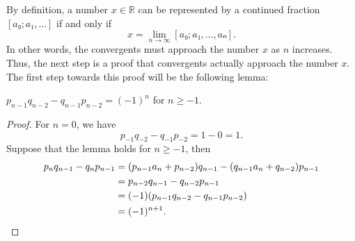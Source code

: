 \iffalse
\begin{figure}[tb]
  \centering
  
  \caption{
    The golden rectangle with side lengths $1$ and $φ$.
    Cutting of one unit square from the rectangle gives another rectangle with lengths $φ - 1$ and $1$.
    The ratio between the longer and shorter side remains the same.
  }
  \label{fig:golden-rectangle}
\end{figure}

\begin{example}
  Consider the golden ratio $φ$.
  It is the positive real root of the polynomial $p(x) = x^2 - x - 1$,
  which means that it satisfies $φ = 1 + 1/φ$.
  Since it is positive, we have $1 < φ = 1 + 1/φ < 2$ and $\floor{φ} = 1$.
  This makes the construction of the continued fraction particularly simple since
  \[
    φ = 1 + \cfrac{1}{1 + \cfrac{1}{1 + \cfrac{1}{⋱}}}.
  \]
  So the golden ratio $φ$ is represented by $[1; \overline{1}]$.
\end{example}

For the golden ratio, there is also a geometric interpretation via the golden
rectangle as shown in Figure~\ref{fig:golden-rectangle}.
The golden rectangle has side lengths of $1$ and $φ$,
and the Euclidean algorithm tries to remove as many unit squares inside the
golden rectangle as possible.
In this case, only one square is removed
and we get a new rectangle with side lengths $1$ and $φ - 1$.
But the ratios between the longer and shorter sides remain the same since
\[
  φ^2 - φ - 1 = 0 ⇔ φ(φ - 1) = 1 ⇔ \frac{φ}{1} = \frac{1}{φ - 1}.
\]
Therefore, in the next rectangle only one square of length $φ - 1$ will be
removed again.
\fi

By definition,
a number $x ∈ ℝ$ can be represented by a continued fraction $[a₀; a₁, …]$
if and only if
\[
  x = \lim_{n → ∞} [a₀; a₁, …, aₙ].
\]
In other words, the convergents must approach the number $x$ as $n$ increases.
Thus, the next step is a proof that convergents actually approach the number $x$.
The first step towards this proof will be the following lemma:

\begin{lemma}
  \label{lem:cf-det}
  $p_{n-1} q_{n-2} - q_{n-1} p_{n-2} = (-1)^n$ for $n ≥ -1$.
\end{lemma}

\begin{proof}
  For $n = 0$, we have
  \[
    p_{-1} q_{-2} - q_{-1} p_{-2} = 1 - 0 = 1.
  \]
  Suppose that the lemma holds for $n ≥ -1$, then
  \begin{align*}
    p_n q_{n-1} - q_n p_{n-1}
    & = (p_{n-1} a_n + p_{n-2}) q_{n-1} - (q_{n-1} a_n + q_{n-2}) p_{n-1} \\
    & = p_{n-2} q_{n-1} - q_{n-2} p_{n-1} \\
    & = (-1) (p_{n-1} q_{n-2} - q_{n-1} p_{n-2}) \\
    & = (-1)^{n+1}. \qedhere
  \end{align*}
\end{proof}

